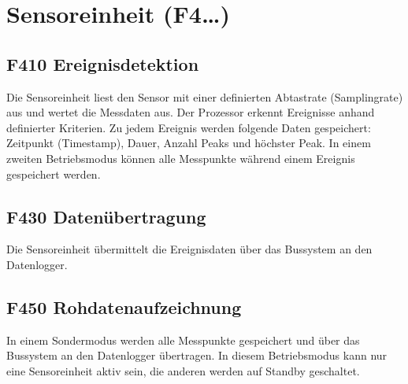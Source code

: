 \section{Sensoreinheit (F4\ldots)}


\subsection{F410 Ereignisdetektion}
Die Sensoreinheit liest den Sensor mit einer definierten Abtastrate (Samplingrate) aus und wertet die Messdaten aus. Der Prozessor erkennt Ereignisse anhand definierter Kriterien. Zu jedem Ereignis werden folgende Daten gespeichert: Zeitpunkt (Timestamp), Dauer, Anzahl Peaks und höchster Peak. In einem zweiten Betriebsmodus können alle Messpunkte während einem Ereignis gespeichert werden.


\subsection{F430 Datenübertragung}
Die Sensoreinheit übermittelt die Ereignisdaten über das Bussystem an den Datenlogger.


\subsection{F450 Rohdatenaufzeichnung}
In einem Sondermodus werden alle Messpunkte gespeichert und über das Bussystem an den Datenlogger übertragen. In diesem Betriebsmodus kann nur eine Sensoreinheit aktiv sein, die anderen werden auf Standby geschaltet.


